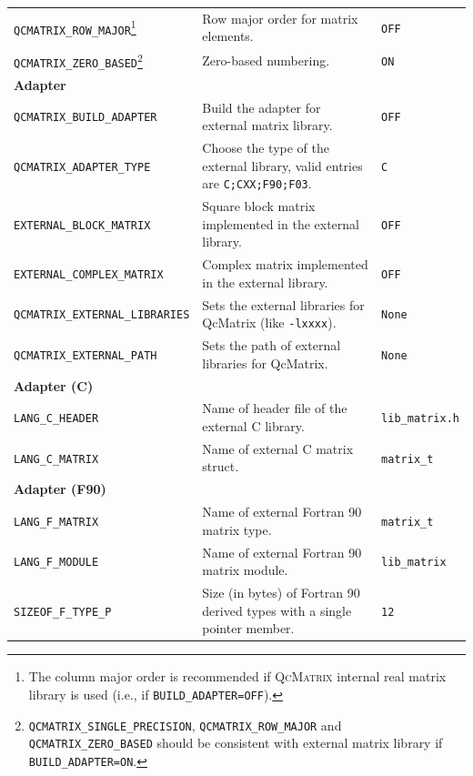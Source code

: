 \documentclass[a4paper,11pt,twoside,openright]{book}
\begin{document}
\begin{center}
\begin{longtable}{l|p{}|l}
    \verb|QCMATRIX_ROW_MAJOR|\footnote{The column major order is recommended if \textsc{QcMatrix}
                                    internal real matrix library is used (i.e., if
                                    \texttt{BUILD\_ADAPTER=OFF}).} %
      & Row major order for matrix elements. & \verb|OFF|\\
    \verb|QCMATRIX_ZERO_BASED|\footnote{\texttt{QCMATRIX\_SINGLE\_PRECISION},
                                         \texttt{QCMATRIX\_ROW\_MAJOR} and
                                         \texttt{QCMATRIX\_ZERO\_BASED} should
                                         be consistent with external matrix library
                                         if \texttt{BUILD\_ADAPTER=ON}.} %
      & Zero-based numbering. & \verb|ON|\\
    \hline
    \textbf{Adapter} & &\\
    \verb|QCMATRIX_BUILD_ADAPTER| & Build the adapter for external matrix library. & \verb|OFF|\\
    \verb|QCMATRIX_ADAPTER_TYPE| %
      & Choose the type of the external library, valid entries are \verb|C;CXX;F90;F03|. & \verb|C|\\
    \verb|EXTERNAL_BLOCK_MATRIX| & Square block matrix implemented in the external library. & \verb|OFF|\\
    \verb|EXTERNAL_COMPLEX_MATRIX| & Complex matrix implemented in the external library. & \verb|OFF|\\
    \verb|QCMATRIX_EXTERNAL_LIBRARIES| %
      & Sets the external libraries for QcMatrix (like \verb|-lxxxx|). & \verb|None|\\
    \verb|QCMATRIX_EXTERNAL_PATH| & Sets the path of external libraries for QcMatrix. & \verb|None|\\
    \hline
    \textbf{Adapter (C)} & &\\
    \verb|LANG_C_HEADER| & Name of header file of the external C library. & \verb|lib_matrix.h|\\
    \verb|LANG_C_MATRIX| & Name of external C matrix struct. & \verb|matrix_t|\\
    \hline
    \textbf{Adapter (F90)} & &\\
    \verb|LANG_F_MATRIX| & Name of external Fortran 90 matrix type. & \verb|matrix_t|\\
    \verb|LANG_F_MODULE| & Name of external Fortran 90 matrix module. & \verb|lib_matrix|\\
    \verb|SIZEOF_F_TYPE_P| %
      & Size (in bytes) of Fortran 90 derived types with a single pointer member. & \verb|12|\\

\end{longtable}
\end{center}
\end{document}
